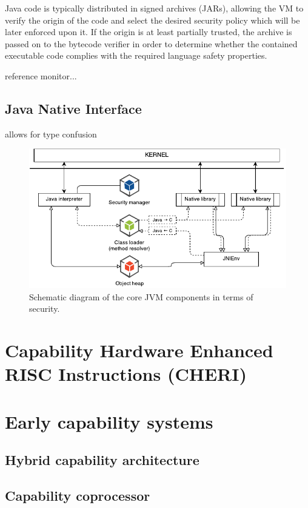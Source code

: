 \documentclass[a4paper,12pt,twoside,openright]{report}
\begin{document}
Java code is typically distributed in signed archives (JARs), allowing the VM to verify the origin of the code and select the desired security policy which will be later enforced upon it. If the origin is at least partially trusted, the archive is passed on to the bytecode verifier in order to determine whether the contained executable code complies with the required language safety properties.



reference monitor...

\subsection{Java Native Interface}

allows for type confusion

\begin{figure}
	\includegraphics[width=\textwidth]{dia_jni_orig.pdf}
	\caption{Schematic diagram of the core JVM components in terms of security.}
\end{figure}

\section{Capability Hardware Enhanced RISC Instructions (CHERI)}

\section{Early capability systems}

\subsection{Hybrid capability architecture}

\subsection{Capability coprocessor}
\end{document}
